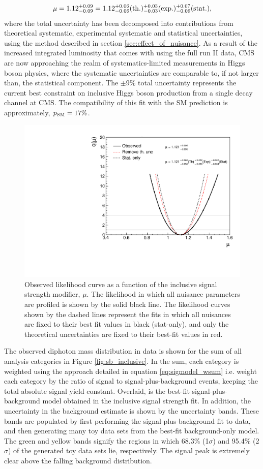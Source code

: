 \begin{equation*}
  \mu = 1.12 ^{+0.09}_{-0.09} = 1.12 ^{+0.06}_{-0.06}({\rm{th.}}) ^{+0.03}_{-0.03}({\rm{exp.}}) ^{+0.07}_{-0.06}({\rm{stat.}}),
\end{equation*}
\noindent
where the total uncertainty has been decomposed into contributions from theoretical systematic, experimental systematic and statistical uncertainties, using the method described in section \ref{sec:effect_of_nuisance}. As a result of the increased integrated luminosity that comes with using the full run II data, CMS are now approaching the realm of systematics-limited measurements in Higgs boson physics, where the systematic uncertainties are comparable to, if not larger than, the statistical component. The $\pm$9\% total uncertainty represents the current best constraint on inclusive Higgs boson production from a single decay channel at CMS. The compatibility of this fit with the SM prediction is approximately, $p_{\rm{SM}}=17\%$.

\begin{figure}[htb]
  \centering
  \includegraphics[width=.6\textwidth]{Figures/hgg_results/likelihood_mu.pdf}
  \caption[Observed likelihood curve for the inclusive signal strength]
  {
    Observed likelihood curve as a function of the inclusive signal strength modifier, $\mu$. The likelihood in which all nuisance parameters are profiled is shown by the solid black line. The likelihood curves shown by the dashed lines represent the fits in which all nuisances are fixed to their best fit values in black (stat-only), and only the theoretical uncertainties are fixed to their best-fit values in red.
  }
  \label{fig:likelihood_mu_inclusive}
\end{figure}

The observed diphoton mass distribution in data is shown for the sum of all analysis categories in Figure \ref{fig:sb_inclusive}. In the sum, each category is weighted using the approach detailed in equation \ref{eq:sigmodel_wsum} i.e. weight each category by the ratio of signal to signal-plus-background events, keeping the total absolute signal yield constant. Overlaid, is the best-fit signal-plus-background model obtained in the inclusive signal strength fit. In addition, the uncertainty in the background estimate is shown by the uncertainty bands. These bands are populated by first performing the signal-plus-background fit to data, and then generating many toy data sets from the best-fit background-only model. The green and yellow bands signify the regions in which 68.3\% (1$\sigma$) and 95.4\% (2$\sigma$) of the generated toy data sets lie, respectively. The signal peak is extremely clear above the falling background distribution.

